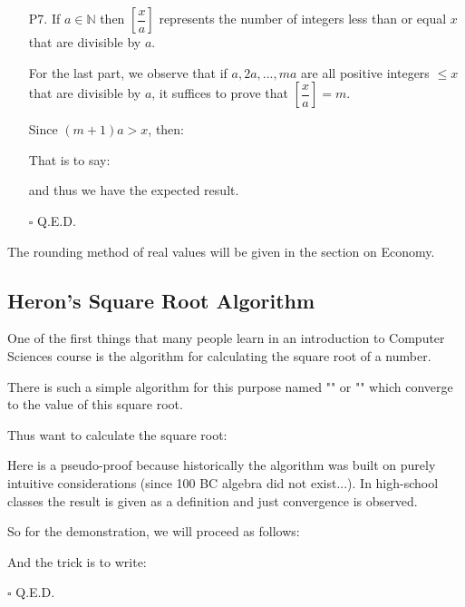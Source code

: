 \begin{enumerate}
		\item[P7.] If $a \in \mathbb{N}$ then $\left[\dfrac{x}{a} \right]$ represents the number of integers less than or equal $x$ that are divisible by $a$.
			\begin{dem}
				For the last part, we observe that if $a, 2a,...,ma$ are all positive integers $\leq x$ that are divisible by $a$, it suffices to prove that $\left[\dfrac{x}{a}\right]=m$. 
				
				Since $(m+1)a>x$, then:
					
				That is to say:
					
				and thus we have the expected result.					
				\begin{flushright}
					$\square$  Q.E.D.
				\end{flushright}			
			\end{dem}
	\end{enumerate}
		\begin{tcolorbox}[title=Remark,colframe=black,arc=10pt]
The rounding method of real values will be given in the section on Economy.
	\end{tcolorbox}
	
	\subsection{Heron's Square Root Algorithm}
	
	One of the first things that many people learn in an introduction to Computer Sciences course is the algorithm for calculating the square root of a number. 
	
	There is such a simple algorithm for this purpose named "" or "" which converge to the value of this square root.
	
	Thus want to calculate the square root:
		
	\begin{dem}
		Here is a pseudo-proof because historically the algorithm was built on purely intuitive considerations (since 100 BC algebra did not exist...). In high-school classes the result is given as a definition and just convergence is observed.
		
		So for the demonstration, we will proceed as follows:
			
			And the trick is to write:
				
				\begin{flushright}
					$\square$  Q.E.D.
				\end{flushright}
	\end{dem}
	
